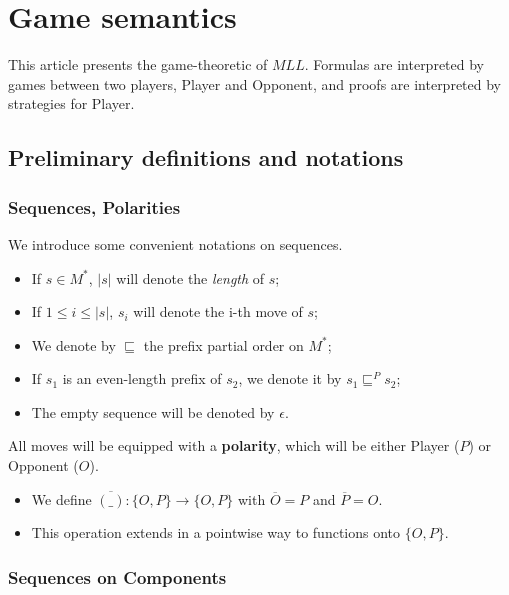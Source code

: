 \chapter{Game semantics}\label{game-semantics}

This article presents the game-theoretic  of \(MLL\). Formulas
are interpreted by games between two players, Player and Opponent, and
proofs are interpreted by strategies for Player.

\section{Preliminary definitions and notations}\label{preliminary-definitions-and-notations}

\subsection{Sequences, Polarities}\label{sequences-polarities}

We introduce some convenient notations on sequences.

\begin{itemize}
\tightlist
\item
  If \(s\in M^*\), \(|s|\) will denote the \emph{length} of \(s\);
\item
  If \(1\leq i\leq |s|\), \(s_i\) will denote the i-th move of \(s\);
\item
  We denote by \(\sqsubseteq\) the prefix partial order on \(M^*\);
\item
  If \(s_1\) is an even-length prefix of \(s_2\), we denote it by
  \(s_1\sqsubseteq^P s_2\);
\item
  The empty sequence will be denoted by \(\epsilon\).
\end{itemize}

All moves will be equipped with a \textbf{polarity}, which will be
either Player (\(P\)) or Opponent (\(O\)).

\begin{itemize}
\tightlist
\item
  We define \(\overline{(\_)}:\{O,P\}\to \{O,P\}\) with
  \(\overline{O} = P\) and \(\overline{P} = O\).
\item
  This operation extends in a pointwise way to functions onto
  \(\{O,P\}\).
\end{itemize}

\subsection{Sequences on Components}\label{sequences-on-components}

